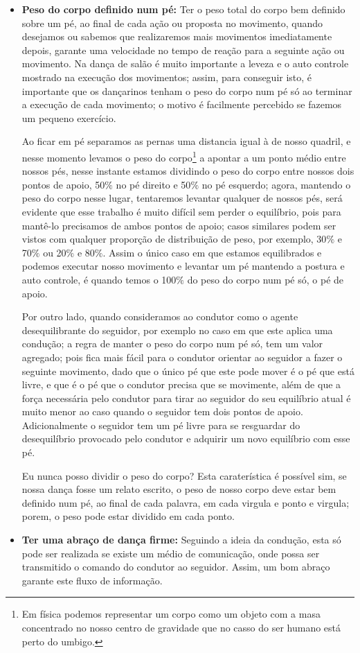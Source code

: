 \begin{itemize}
\item \textbf{Peso do corpo definido num pé:}
Ter o peso total do corpo bem definido sobre um pé, 
ao final de cada ação ou proposta no movimento,
quando desejamos ou sabemos que realizaremos mais movimentos imediatamente depois,
garante uma velocidade no tempo de reação para a seguinte ação ou movimento. 
Na dança de salão é muito importante a leveza e o auto controle mostrado na 
execução dos movimentos; assim, para conseguir isto, é importante que os dançarinos
tenham o peso do corpo num pé só ao terminar a execução de cada movimento; o motivo
é facilmente percebido se fazemos um pequeno exercício. 

Ao ficar em pé separamos as
pernas uma distancia igual à de nosso quadril, e nesse momento levamos o peso do corpo\footnote{
Em física podemos representar um corpo como um objeto com a masa concentrado no nosso centro de gravidade que no casso do ser humano está perto do umbigo.} a
apontar a um ponto médio entre nossos pés, nesse instante estamos dividindo o peso do corpo
entre nossos dois pontos de apoio, 50$\%$ no pé direito e 50$\%$ no pé esquerdo; agora, mantendo o peso
do corpo nesse lugar, tentaremos levantar qualquer de nossos pés, será evidente
que esse trabalho é muito difícil sem perder o equilíbrio, pois para mantê-lo
precisamos de ambos pontos de apoio; casos similares podem ser vistos com qualquer proporção de distribuição de peso,
por exemplo, 30$\%$ e 70$\%$ ou 20$\%$ e 80$\%$. Assim o único caso em que estamos
equilibrados e podemos executar nosso movimento e levantar um pé 
mantendo a postura e auto controle, é quando
temos o 100$\%$ do peso do corpo num pé só, o pé de apoio.
 
Por outro lado, quando consideramos ao condutor como o agente desequilibrante do seguidor, por exemplo no caso
em que este aplica uma condução;
a regra de manter o peso do corpo num pé só, tem um valor agregado; 
pois fica mais fácil para o condutor orientar
ao seguidor a fazer o seguinte movimento, dado que o único pé que este pode mover é o pé
que está livre, e que é o pé que o condutor precisa que se movimente, 
além de que a força necessária pelo condutor para tirar ao seguidor do seu equilíbrio 
atual é muito menor ao caso quando o seguidor tem dois pontos de apoio.
Adicionalmente o seguidor tem um pé livre para se resguardar do desequilíbrio provocado pelo 
condutor e adquirir um novo equilíbrio com esse pé.

Eu nunca posso dividir o peso do corpo? Esta caraterística é possível sim,
se nossa dança fosse um relato escrito, o peso de nosso corpo deve estar bem definido num pé,
ao final de cada palavra, em cada virgula e ponto e virgula; porem, 
o peso pode estar dividido em cada ponto.

\item \textbf{Ter uma abraço de dança firme:} Seguindo a ideia da condução, esta só pode
ser realizada se existe um médio de comunicação, onde possa ser transmitido
o comando do condutor ao seguidor. Assim, um bom abraço garante este
fluxo de informação.
\end{itemize}

